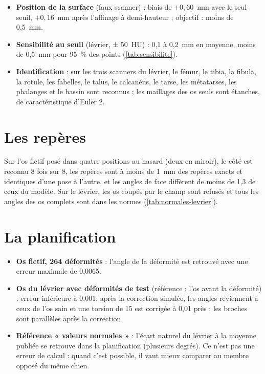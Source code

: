 \begin{itemize}
  \item \textbf{Position de la surface} (faux scanner) : biais de $+0{,}60$~mm avec le seul seuil, $+0{,}16$~mm après
  l'affinage à demi-hauteur ; objectif : moins de 0,5~mm.
  \item \textbf{Sensibilité au seuil} (lévrier, ± 50~HU) : 0,1 à 0,2~mm en moyenne, moins de 0,5~mm pour 95~\% des
  points (\cref{tab:sensibilite}).
  \item \textbf{Identification} : sur les trois scanners du lévrier, le fémur, le tibia, la fibula, la rotule, les
  fabelles, le talus, le calcanéus, le tarse, les métatarses, les phalanges et le bassin sont reconnus ; les maillages
  des os seuls sont étanches, de caractéristique d'Euler 2.
\end{itemize}

\section{Les repères}

Sur l'os fictif posé dans quatre positions au hasard (deux en miroir), le côté est reconnu 8 fois sur 8, les repères
sont à moins de 1~mm des repères exacts et identiques d'une pose à l'autre, et les angles de face diffèrent de moins de
1,3\degre{} de ceux du modèle. Sur le lévrier, les os coupés par le champ sont refusés et tous les angles des os
complets sont dans les normes (\cref{tab:normales-levrier}).

\section{La planification}

\begin{itemize}
  \item \textbf{Os fictif, 264 déformités} : l'angle de la déformité est retrouvé avec une erreur maximale de
  0,0065\degre.
  \item \textbf{Os du lévrier avec déformités de test} (référence : l'os avant la déformité) : erreur inférieure à
  0,001\degre ; après la correction simulée, les angles reviennent à ceux de l'os sain et une torsion de 15\degre{} est
  corrigée à 0,01\degre{} près ; les broches sont parallèles après la correction.
  \item \textbf{Référence « valeurs normales »} : l'écart naturel du lévrier à la moyenne publiée se retrouve dans la
  planification (plusieurs degrés). Ce n'est pas une erreur de calcul : quand c'est possible, il vaut mieux comparer au
  membre opposé du même chien.
\end{itemize}

